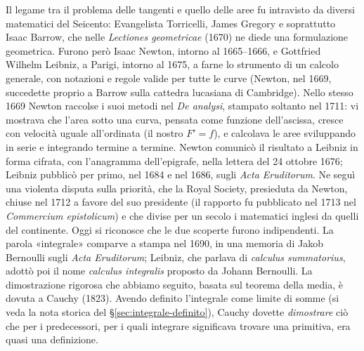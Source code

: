\begin{notastorica}
Il legame tra il problema delle tangenti e quello delle aree fu intravisto da diversi
matematici del Seicento: Evangelista Torricelli, James Gregory e soprattutto Isaac
Barrow, che nelle \emph{Lectiones geometricae} (1670) ne diede una formulazione
geometrica. Furono però Isaac Newton, intorno al 1665--1666, e Gottfried Wilhelm
Leibniz, a Parigi, intorno al 1675, a farne lo strumento di un calcolo generale, con
notazioni e regole valide per tutte le curve (Newton, nel 1669, succedette proprio a
Barrow sulla cattedra lucasiana di Cambridge). Nello stesso 1669 Newton raccolse i suoi
metodi nel \emph{De analysi}, stampato soltanto nel 1711: vi mostrava che l'area sotto
una curva, pensata come funzione dell'ascissa, cresce con velocità uguale all'ordinata
(il nostro $F'=f$), e calcolava le aree sviluppando in serie e integrando termine a
termine. Newton
comunicò il risultato a Leibniz in forma cifrata, con l'anagramma dell'epigrafe, nella
lettera del 24 ottobre 1676; Leibniz pubblicò per primo, nel 1684 e nel 1686, sugli
\emph{Acta Eruditorum}. Ne seguì una violenta disputa sulla priorità, che la Royal
Society, presieduta da Newton, chiuse nel 1712 a favore del suo presidente (il rapporto
fu pubblicato nel 1713 nel \emph{Commercium epistolicum}) e che divise
per un secolo i matematici inglesi da quelli del continente. Oggi si riconosce che le
due scoperte furono indipendenti. La parola «integrale» comparve a stampa nel 1690, in
una memoria di Jakob Bernoulli sugli \emph{Acta Eruditorum}; Leibniz, che parlava di
\emph{calculus summatorius}, adottò poi il nome \emph{calculus integralis} proposto da
Johann Bernoulli. La dimostrazione rigorosa che abbiamo seguito, basata sul teorema
della media, è dovuta a Cauchy (1823). Avendo definito l'integrale come limite di somme
(si veda la nota storica del \S\ref{sec:integrale-definito}), Cauchy dovette
\emph{dimostrare} ciò che per i predecessori, per i quali integrare significava trovare
una primitiva, era quasi una definizione.
\end{notastorica}
